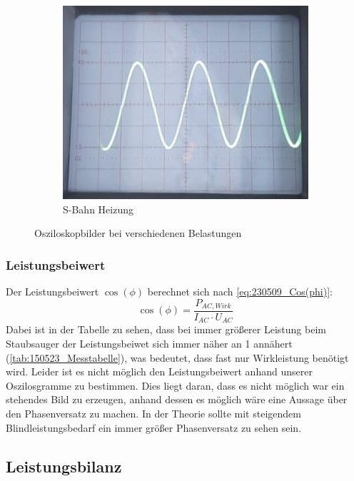 \begin{figure}[H]
\begin{subfigure}[c]{0.19\textwidth}
		\includegraphics[width=\textwidth]{Abbildungen/Oszi_S-Bahn_Heiz.jpg}
		\caption{S-Bahn Heizung}
	\end{subfigure}
	\caption{Osziloskopbilder bei verschiedenen Belastungen}
	\label{fig:oszi}
\end{figure}


\subsubsection{Leistungsbeiwert}
Der Leistungsbeiwert $ \cos(\phi) $ berechnet sich nach \autoref{eq:230509_Cos(phi)}:
%
\begin{equation}
	\cos(\phi)=\frac{ P_{ AC,Wirk } }{  I_{ AC } \cdot U_{AC }}
	\label{eq:230509_Cos(phi)}
\end{equation}
%
Dabei ist in der Tabelle zu sehen, dass bei immer größerer Leistung beim Staubsauger der Leistungsbeiwet sich immer näher an 1 annähert (\autoref{tab:150523_Messtabelle}), was bedeutet, dass fast nur Wirkleistung benötigt wird. 
Leider ist es nicht möglich den Leistungsbeiwert anhand unserer Oszilosgramme zu bestimmen. 
Dies liegt daran, dass es nicht möglich war ein stehendes Bild zu erzeugen, anhand dessen es möglich wäre eine Aussage über den Phasenversatz zu machen. 
In der Theorie sollte mit steigendem Blindleistungsbedarf ein immer größer Phasenversatz zu sehen sein.

\subsection{Leistungsbilanz}
